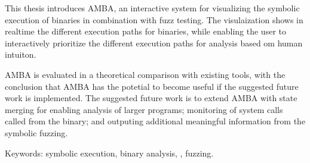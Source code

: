 This thesis introduces AMBA, an interactive system for visualizing the symbolic execution of binaries in combination with fuzz testing.
The visulaization shows in realtime the different execution paths for binaries, while enabling the user to interactively prioritize the different execution paths for analysis based om human intuiton.

AMBA is evaluated in a theoretical comparison with existing tools, with the conclusion that AMBA has the potetial to become useful if the suggested future work is implemented.
The suggested future work is to extend AMBA with state merging for enabling analysis of larger programs; monitoring of system calls called from the binary; and outputing additional meaningful information from the symbolic fuzzing.

Keywords: symbolic execution, binary analysis, \stoe{}, fuzzing.
